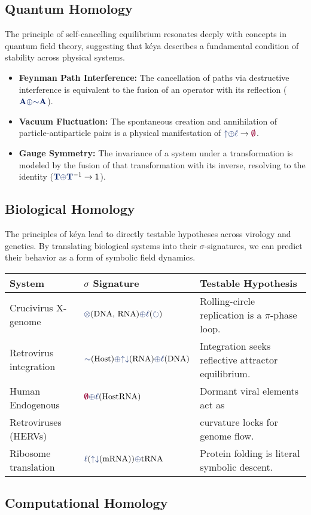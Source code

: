 \subsection{Quantum Homology}
The principle of self-cancelling equilibrium resonates deeply with concepts in quantum field theory, suggesting that kéya describes a fundamental condition of stability across physical systems.
\begin{itemize}
    \item \textbf{Feynman Path Interference:} The cancellation of paths via destructive interference is equivalent to the fusion of an operator with its reflection ($\op{A} \fuse \reflec\op{A}$).
    \item \textbf{Vacuum Fluctuation:} The spontaneous creation and annihilation of particle-antiparticle pairs is a physical manifestation of $\grow \fuse \lha \to \void$.
    \item \textbf{Gauge Symmetry:} The invariance of a system under a transformation is modeled by the fusion of that transformation with its inverse, resolving to the identity ($\op{T} \fuse \op{T}^{-1} \to \sym{1}$).
\end{itemize}

\subsection{Biological Homology}
The principles of kéya lead to directly testable hypotheses across virology and genetics. By translating biological systems into their $\sigma$-signatures, we can predict their behavior as a form of symbolic field dynamics.

\begin{center}
\renewcommand{\arraystretch}{1.2}
\begin{tabular}{l l l}
\hline
\textbf{System} & \textbf{$\sigma$ Signature} & \textbf{Testable Hypothesis} \\
\hline
Crucivirus X-genome & $\tensor(\text{DNA, RNA}) \fuse \lha(\rotate)$ & Rolling-circle replication is a $\pi$-phase loop. \\
Retrovirus integration & $\reflec(\text{Host}) \fuse \repflow(\text{RNA}) \fuse \lha(\text{DNA})$ & Integration seeks reflective attractor equilibrium. \\
Human Endogenous & $\void \fuse \lha(\text{HostRNA})$ & Dormant viral elements act as \\
Retroviruses (HERVs) & & curvature locks for genome flow. \\
Ribosome translation & $\lha(\repflow(\text{mRNA})) \fuse \text{tRNA}$ & Protein folding is literal symbolic descent. \\
\hline
\end{tabular}
\end{center}

\subsection{Computational Homology}
